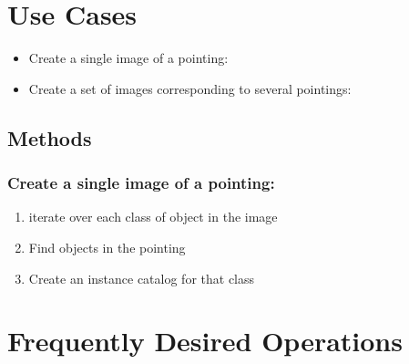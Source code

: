 \documentclass{article}[12pt]
\begin{document}
\section{Use Cases}
\begin{itemize}
    \item Create a single image of a pointing: 
    \item Create a set of images corresponding to several pointings: 
\end{itemize}
\subsection{Methods}
\subsubsection{Create a single image of a pointing:}
\begin{enumerate}
    \item iterate over each class of object in the image
    \item Find objects in the pointing
    \item Create an instance catalog for that class
\end{enumerate}
\section{Frequently Desired Operations}
\end{document}

